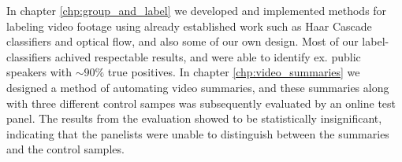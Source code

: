 %
In chapter \ref{chp:group_and_label} we developed and implemented methods for labeling video footage using already established work such as Haar Cascade classifiers and optical flow, and also some of our own design. Most of our label-classifiers achived respectable results, and were able to identify ex. public speakers with $\sim 90\%$ true positives.
%
%
%
In chapter \ref{chp:video_summaries} we designed a method of automating video summaries, and these summaries along with three different control sampes was subsequently evaluated by an online test panel. The results from the evaluation showed to be statistically insignificant, indicating that the panelists were unable to distinguish between the summaries and the control samples.
%
